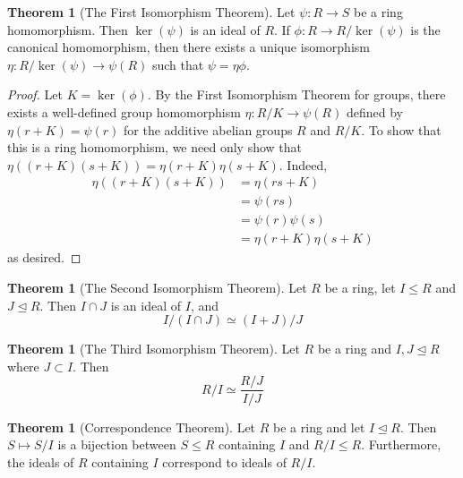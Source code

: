\documentclass[11pt]{book}
\theoremstyle{definition}\newtheorem{definition}[subsection]{Definition}
\theoremstyle{definition}\newtheorem{example}[subsection]{Example}
\theoremstyle{definition}\newtheorem{notation}[subsection]{Notation}
\theoremstyle{definition}\newtheorem{remark}[subsection]{Remark}
\theoremstyle{theorem}\newtheorem{theorem}[subsection]{Theorem}
\theoremstyle{theorem}\newtheorem{lemma}[subsection]{Lemma}
\theoremstyle{theorem}\newtheorem{proposition}[subsection]{Proposition}
\theoremstyle{theorem}\newtheorem{corollary}[subsection]{Corollary}
\newcommand{\teq}{\trianglelefteq}
\begin{document}
\begin{theorem}[The First Isomorphism Theorem]\label{theorem:1.3.15}
    Let $\psi : R \to S$ be a ring homomorphism. Then $\ker(\psi)$ is an ideal of $R$. If $\phi : R \to R/\ker(\psi)$ is the canonical homomorphism, then there exists a unique isomorphism $\eta : R/\ker(\psi) \to \psi(R)$ such that $\psi = \eta\phi$.
\end{theorem}

\begin{proof}
    Let $K = \ker(\phi)$. By the First Isomorphism Theorem for groups, there exists a well-defined group homomorphism $\eta : R/K \to \psi(R)$ defined by $\eta(r + K) = \psi(r)$ for the additive abelian groups $R$ and $R/K$. To show that this is a ring homomorphism, we need only show that $\eta((r + K)(s + K)) = \eta(r + K)\eta(s + K)$. Indeed,
    \begin{align*}
        \eta((r + K)(s + K)) &= \eta(rs + K) \\
        &= \psi(rs) \\
        &= \psi(r)\psi(s) \\
        &= \eta(r + K)\eta(s + K)
    \end{align*}
    as desired.
\end{proof}

\begin{theorem}[The Second Isomorphism Theorem]\label{theorem:1.3.16}
    Let $R$ be a ring, let $I \leq R$ and $J \teq R$. Then $I \cap J$ is an ideal of $I$, and
    \begin{equation*}
        I/(I \cap J) \simeq (I + J)/J
    \end{equation*}
\end{theorem}

\begin{theorem}[The Third Isomorphism Theorem]\label{theorem:1.3.17}
    Let $R$ be a ring and $I, J \teq R$ where $J \subset I$. Then
    \begin{equation*}
        R/I \simeq \frac{R/J}{I/J}
    \end{equation*}
\end{theorem}

\begin{theorem}[Correspondence Theorem]\label{theorem:1.3.17}
    Let $R$ be a ring and let $I \teq R$. Then $S \mapsto S/I$ is a bijection between $S \leq R$ containing $I$ and $R/I \leq R$. Furthermore, the ideals of $R$ containing $I$  correspond to ideals of $R/I$.
\end{theorem}
\end{document}
